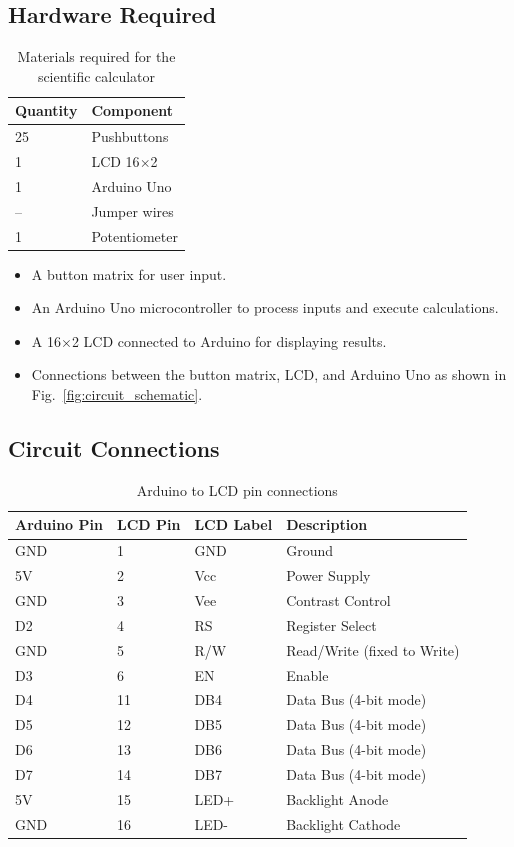 \documentclass[conference]{IEEEtran}
\begin{document}
\subsection{Hardware Required}
\begin{table}[H]
\centering
\caption{Materials required for the scientific calculator}
\label{tab:materials}
\renewcommand{\arraystretch}{1.2}
\begin{tabular}{ll}
\toprule
\textbf{Quantity} & \textbf{Component} \\
\midrule
25 & Pushbuttons \\
1  & LCD 16$\times$2 \\
1  & Arduino Uno \\
-- & Jumper wires \\
1  & Potentiometer \\
\bottomrule
\end{tabular}
\end{table}

\begin{itemize}
    \item A button matrix for user input.
    \item An Arduino Uno microcontroller to process inputs and execute calculations.
    \item A 16$\times$2 LCD connected to Arduino for displaying results.
    \item Connections between the button matrix, LCD, and Arduino Uno as shown in Fig.~\ref{fig:circuit_schematic}.
\end{itemize}

\subsection{Circuit Connections}
\begin{table}[H]
\centering
\caption{Arduino to LCD pin connections}
\label{tab:arduino-lcd}
\renewcommand{\arraystretch}{1.2}
\begin{tabular}{llll}
\toprule
\textbf{Arduino Pin} & \textbf{LCD Pin} & \textbf{LCD Label} & \textbf{Description} \\
\midrule
GND  & 1  & GND   & Ground \\
5V   & 2  & Vcc   & Power Supply \\
GND  & 3  & Vee   & Contrast Control \\
D2   & 4  & RS    & Register Select \\
GND  & 5  & R/W   & Read/Write (fixed to Write) \\
D3   & 6  & EN    & Enable \\
D4   & 11 & DB4   & Data Bus (4-bit mode) \\
D5   & 12 & DB5   & Data Bus (4-bit mode) \\
D6   & 13 & DB6   & Data Bus (4-bit mode) \\
D7   & 14 & DB7   & Data Bus (4-bit mode) \\
5V   & 15 & LED+  & Backlight Anode \\
GND  & 16 & LED-  & Backlight Cathode \\
\bottomrule
\end{tabular}
\end{table}
\end{document}
